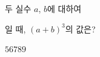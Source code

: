 두 실수 $a$, $b$에 대하여\par\smallskip{}\par\smallskip\noindent 일 때, $(a+b)^3$의 값은?
\begin{choices32}{$5$}{$6$}{$7$}{$8$}{$9$}\end{choices32}
